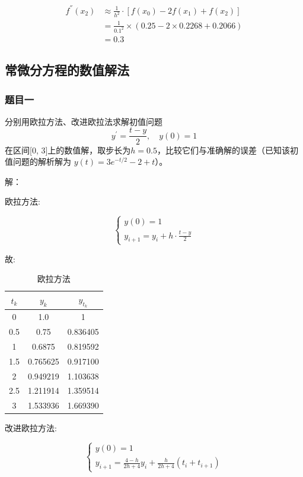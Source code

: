 \documentclass[UTF8]{ctexart}
\begin{document}
\begin{equation}\nonumber
    \begin{split}
        f^{''}(x_2) &\approx \frac{1}{h^2}\cdot[f(x_0)-2f(x_1)+f(x_2)]\\
        &=\frac{1}{{0.1}^2} \times (0.25-2\times0.2268+0.2066)\\
        &= 0.3
    \end{split}
\end{equation}

\subsection{常微分方程的数值解法}
\subsubsection{题目一}
分别用欧拉方法、改进欧拉法求解初值问题
$$
y^{\prime}=\frac{t-y}{2}, \quad y(0)=1
$$
在区间[0, 3]上的数值解，取步长为$h=0.5$，比较它们与准确解的误差（已知该初值问题的解析解为
$y(t)=3 e^{-t / 2}-2+t$）。

解：

欧拉方法:

\begin{equation}\nonumber
    \left\{\begin{array}{l}
        y(0)=1 \\
        y_{i+1}=y_{i}+h \cdot \frac{t-y}{2}
        \end{array}\right.
\end{equation}

故:

\begin{longtable}{c|c|c}
    \caption{欧拉方法}\\
    \hline $t_k$ & $y_k$ & $y_{t_k}$\\
    \hline0   & 1.0      & 1\\
     0.5 & 0.75     & 0.836405\\
     1   & 0.6875   & 0.819592\\
     1.5 & 0.765625 & 0.917100\\
     2   & 0.949219 & 1.103638\\
     2.5 & 1.211914 & 1.359514\\
     3   & 1.533936 & 1.669390\\
    \hline      
\end{longtable}


改进欧拉方法:

\begin{equation}\nonumber
    \left\{\begin{array}{c}
        y(0)=1 \\
        y_{i+1}=\frac{4-h}{2 h+4} y_{i}+\frac{h}{2 h+4}\left(t_{i}+t_{i+1}\right)
        \end{array}\right.
\end{equation}
\end{document}
